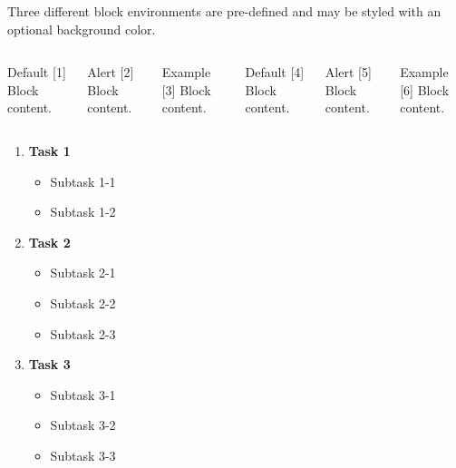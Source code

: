 \documentclass{beamer}
\newcommand{\autotitle}{\secname\ifdefempty{\subsecname}{}{~--- \subsecname}}
\begin{document}
\begin{frame}{\autotitle}
    Three different block environments are pre-defined and may be styled with an
    optional background color.

    \begin{columns}[T,onlytextwidth]
        
        \begin{block}{Default}
            [1] Block content.
        \end{block}
        
        \begin{alertblock}{Alert}
            [2] Block content.
        \end{alertblock}
        
        \begin{exampleblock}{Example}
            [3] Block content.
        \end{exampleblock}
        
        
        \begin{block}{Default}
            [4] Block content.
        \end{block}
        
        \begin{alertblock}{Alert}
            [5] Block content.
        \end{alertblock}
        
        \begin{exampleblock}{Example}
            [6] Block content.
        \end{exampleblock}
    \end{columns}
\end{frame}

\begin{frame}{\autotitle}
    \begin{enumerate}
        \item \textbf{Task 1}
        \begin{itemize}
            \item Subtask 1-1
            \item Subtask 1-2
        \end{itemize}
        \item \textbf{Task 2}
        \begin{itemize}
            \item Subtask 2-1
            \item Subtask 2-2
            \item Subtask 2-3
        \end{itemize}
        \item \textbf{Task 3}
        \begin{itemize}
            \item Subtask 3-1
            \item Subtask 3-2
            \item Subtask 3-3
        \end{itemize}
    \end{enumerate}
\end{frame}
\end{document}
